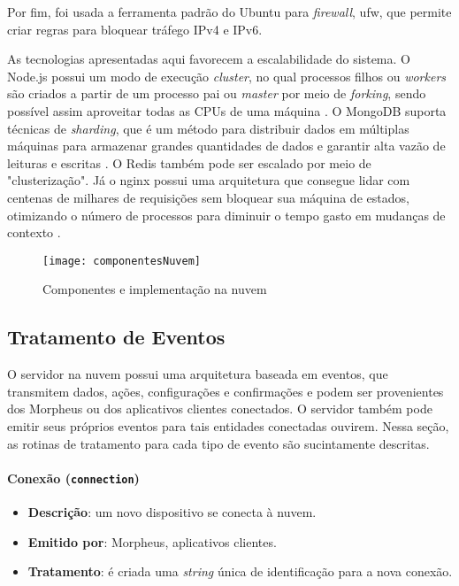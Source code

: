 Por fim, foi usada a ferramenta padrão do Ubuntu para \emph{firewall}, ufw, que permite criar regras para bloquear tráfego IPv4 e IPv6.

As tecnologias apresentadas aqui favorecem a escalabilidade do sistema. O Node.js possui um modo de execução \emph{cluster}, no qual processos filhos ou \emph{workers} são criados a partir de um processo pai ou \emph{master} por meio de \emph{forking}, sendo possível assim aproveitar todas as CPUs de uma máquina \cite{nodejscluster}. O MongoDB suporta técnicas de \emph{sharding}, que é um método para distribuir dados em múltiplas máquinas para armazenar grandes quantidades de dados e garantir alta vazão de leituras e escritas \cite{mongodbsharding}. O Redis também pode ser escalado por meio de "clusterização". Já o nginx possui uma arquitetura que consegue lidar com centenas de milhares de requisições sem bloquear sua máquina de estados, otimizando o número de processos para diminuir o tempo gasto em mudanças de contexto \cite{nginxscalability}.

\begin{figure}[H]
	\centering
	\caption{Componentes e implementação na nuvem}
  \texttt{[image: componentesNuvem]}
\label{fig:componentesNuvem}
\end{figure}

\subsection{Tratamento de Eventos}

O servidor na nuvem possui uma arquitetura baseada em eventos, que transmitem dados, ações, configurações e confirmações e podem ser provenientes dos Morpheus ou dos aplicativos clientes conectados. O servidor também pode emitir seus próprios eventos para tais entidades conectadas ouvirem. Nessa seção, as rotinas de tratamento para cada tipo de evento são sucintamente descritas.

\paragraph{Conexão (\texttt{connection})}
\begin{itemize}
\item \textbf{Descrição}: um novo dispositivo se conecta à nuvem.
\item \textbf{Emitido por}: Morpheus, aplicativos clientes.
\item \textbf{Tratamento}: é criada uma \emph{string} única de identificação para a nova conexão.
\end{itemize}

